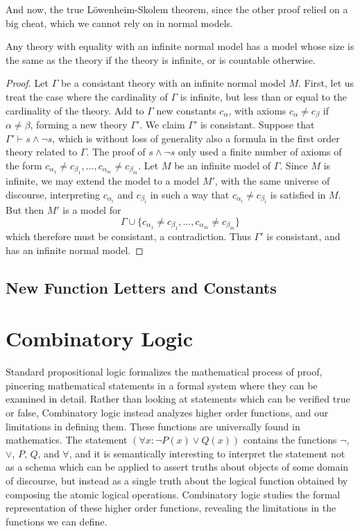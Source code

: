 And now, the true L\"{o}wenheim-Skolem theorem, since the other proof relied on a big cheat, which we cannot rely on in normal models.

\begin{corollary}
    Any theory with equality with an infinite normal model has a model whose size is the same as the theory if the theory is infinite, or is countable otherwise.
\end{corollary}
\begin{proof}
    Let $\Gamma$ be a consistant theory with an infinite normal model $M$. First, let us treat the case where the cardinality of $\Gamma$ is infinite, but less than or equal to the cardinality of the theory. Add to $\Gamma$ new constants $c_\alpha$, with axioms $c_\alpha \neq c_\beta$ if $\alpha \neq \beta$, forming a new theory $\Gamma'$. We claim $\Gamma'$ is consistant. Suppose that $\Gamma' \vdash s \wedge \neg s$, which is without loss of generality also a formula in the first order theory related to $\Gamma$. The proof of $s \wedge \neg s$ only used a finite number of axioms of the form $c_{\alpha_1} \neq c_{\beta_1}, \dots, c_{\alpha_m} \neq c_{\beta_m}$. Let $M$ be an infinite model of $\Gamma$. Since $M$ is infinite, we may extend the model to a model $M'$, with the same universe of discourse, interpreting $c_{\alpha_i}$ and $c_{\beta_i}$ in such a way that $c_{\alpha_i} \neq c_{\beta_i}$ is satisfied in $M$. But then $M'$ is a model for
    \[ \Gamma \cup \{ c_{\alpha_1} \neq c_{\beta_1}, \dots, c_{\alpha_m} \neq c_{\beta_m} \} \]
    which therefore must be consistant, a contradiction. Thus $\Gamma'$ is consistant, and has an infinite normal model.
\end{proof}

\section{New Function Letters and Constants}


\chapter{Combinatory Logic}

Standard propositional logic formalizes the mathematical process of proof, pincering mathematical statements in a formal system where they can be examined in detail. Rather than looking at statements which can be verified true or false, Combinatory logic instead analyzes higher order functions, and our limitations in defining them. These functions are universally found in mathematics. The statement $(\forall x: \neg P(x) \vee Q(x))$ contains the functions $\neg$, $\vee$, $P$, $Q$, and $\forall$, and it is semantically interesting to interpret the statement not as a schema which can be applied to assert truths about objects of some domain of discourse, but instead as a single truth about the logical function obtained by composing the atomic logical operations. Combinatory logic studies the formal representation of these higher order functions, revealing the limitations in the functions we can define.

